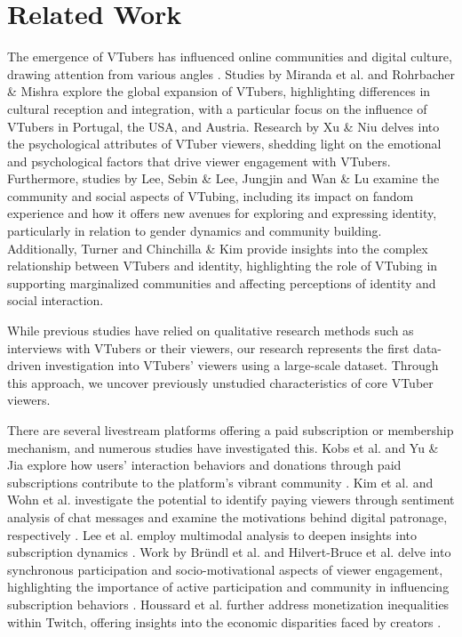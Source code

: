 

\section{Related Work}
The emergence of VTubers has influenced online communities and digital culture, drawing attention from various angles \cite{lu2021kawaii, 10.1145/3604479.3604523}. 
Studies by Miranda et al. \cite{10.1007/978-3-031-45642-8_22} and Rohrbacher \& Mishra \cite{10.1007/978-3-031-61281-7_15} explore the global expansion of VTubers, highlighting differences in cultural reception and integration, with a particular focus on the influence of VTubers in Portugal, the USA, and Austria. Research by Xu \& Niu \cite{Xu_Niu_2023} delves into the psychological attributes of VTuber viewers, shedding light on the emotional and psychological factors that drive viewer engagement with VTubers. Furthermore, studies by Lee, Sebin \& Lee, Jungjin \cite{10058945} and Wan \& Lu \cite{10.1145/3637357} examine the community and social aspects of VTubing, including its impact on fandom experience and how it offers new avenues for exploring and expressing identity, particularly in relation to gender dynamics and community building. 
Additionally, Turner \cite{Turner1676326} and Chinchilla \& Kim \cite{doi:10.1080/10510974.2024.2337955} provide insights into the complex relationship between VTubers and identity, highlighting the role of VTubing in supporting marginalized communities and affecting perceptions of identity and social interaction. 

While previous studies have relied on qualitative research methods such as interviews with VTubers or their viewers, our research represents the first data-driven investigation into VTubers' viewers using a large-scale dataset. Through this approach, we uncover previously unstudied characteristics of core VTuber viewers.


There are several livestream platforms offering a paid subscription or membership mechanism, and numerous studies have investigated this.
% 
Kobs et al. and Yu \& Jia explore how users' interaction behaviors and donations through paid subscriptions contribute to the platform's vibrant community \cite{kobs2020towards, 10.1145/3487553.3524260}. 
Kim et al. and Wohn et al. investigate the potential to identify paying viewers through sentiment analysis of chat messages and examine the motivations behind digital patronage, respectively \cite{10.1145/3311957.3359470, 10.1145/3311350.3347160}. 
Lee et al. employ multimodal analysis to deepen insights into subscription dynamics \cite{lee2024multimodal}.
Work by Bründl et al. and Hilvert-Bruce et al. delve into synchronous participation and socio-motivational aspects of viewer engagement, highlighting the importance of active participation and community in influencing subscription behaviors \cite{doi:10.1080/0960085X.2022.2062468, HILVERTBRUCE201858}. 
Houssard et al. further address monetization inequalities within Twitch, offering insights into the economic disparities faced by creators \cite{houssard2023monetization}. 

